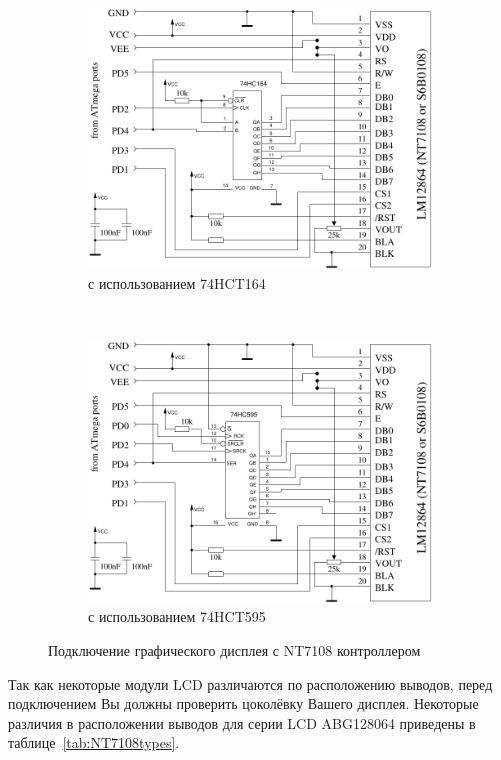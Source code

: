 \begin{figure}[H]
  \begin{subfigure}[b]{.5\textwidth}
    \centering
    \includegraphics[width=.9\textwidth]{../FIG/ST7108serial164.pdf}
    \caption{с использованием 74HCT164}
  \end{subfigure}
  ~
  \begin{subfigure}[b]{.5\textwidth}
    \centering
    \includegraphics[width=.9\textwidth]{../FIG/ST7108serial595.pdf}
    \caption{с использованием 74HCT595}
  \end{subfigure}
  \caption{Подключение графического дисплея с NT7108 контроллером}
  \label{fig:NT7108lcd}
\end{figure}

Так как некоторые модули LCD различаются по расположению выводов, перед подключением Вы должны проверить цоколёвку 
Вашего дисплея. 
Некоторые различия в расположении выводов для серии LCD ABG128064 приведены в таблице~\ref{tab:NT7108types}.

